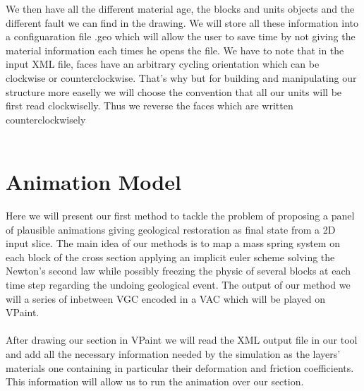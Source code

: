 \documentclass[12pt, a4paper]{report} %
\begin{document}
We then have all the different material age, the blocks and units objects and the different fault we can find in the drawing. We will store all these information into a configuaration file .geo which will allow the user to save time by not giving the material information each times he opens the file. We have to note that in the input XML file, faces have an arbitrary cycling orientation which can be clockwise or counterclockwise. That's why but for building and manipulating our structure more easelly we will choose the convention that all our units will be first read clockwiselly. Thus we reverse the faces which are written counterclockwisely\\\\

\chapter{Animation Model}
\label{ch:animationmodel}
Here we will present our first method to tackle the problem of proposing a panel of plausible animations giving geological restoration as final state from a 2D input slice. 
The main idea of our methods is to map a mass spring system on each block of the cross section applying an implicit euler scheme solving the Newton's second law while possibly freezing the physic of several blocks at each time step regarding the undoing geological event. The output of our method we will a series of inbetween VGC encoded in a VAC which will be played on VPaint.\\\\
After drawing our section in VPaint we will read the XML output file in our tool  and add all the necessary information needed by the simulation as the layers' materials one containing in particular their deformation and friction coefficients. This information will allow us to run the animation over our section.\\
\end{document}
